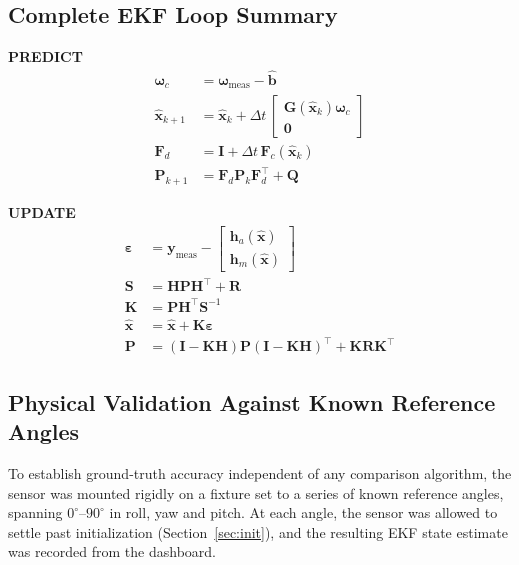 \documentclass[12pt,a4paper]{article}
\newcommand{\bx}{\bm{x}}
\newcommand{\bF}{\bm{F}}
\newcommand{\bG}{\bm{G}}
\newcommand{\bP}{\bm{P}}
\newcommand{\bQ}{\bm{Q}}
\newcommand{\bI}{\bm{I}}
\newcommand{\bomega}{\bm{\omega}}
\begin{document}
{%
\subsection{Complete EKF Loop Summary}
\label{sec:loop}

\textbf{PREDICT}
\begin{align*}
  \bomega_c         &= \bomega_{\text{meas}} - \hat{\bm{b}} \\
  \hat{\bx}_{k+1}   &= \hat{\bx}_k + \Delta t\,
                        \begin{bmatrix}\bG(\hat{\bx}_k)\bomega_c \\ \bm{0}\end{bmatrix} \\
  \bF_d             &= \bI + \Delta t\,\bF_c(\hat{\bx}_k) \\
  \bP_{k+1}         &= \bF_d\bP_k\bF_d^{\top} + \bQ
\end{align*}

\textbf{UPDATE}
\begin{align*}
  \bm{\varepsilon}  &= \bm{y}_{\text{meas}} -
                        \begin{bmatrix}\bm{h}_a(\hat{\bx})\\\bm{h}_m(\hat{\bx})\end{bmatrix} \\
  \bm{S}            &= \bm{H}\bP\bm{H}^{\top} + \bm{R} \\
  \bm{K}            &= \bP\bm{H}^{\top}\bm{S}^{-1} \\
  \hat{\bx}         &= \hat{\bx} + \bm{K}\bm{\varepsilon} \\
  \bP               &= (\bI{-}\bm{K}\bm{H})\bP(\bI{-}\bm{K}\bm{H})^{\top}
                        + \bm{K}\bm{R}\bm{K}^{\top}
\end{align*}




\subsection{Physical Validation Against Known Reference Angles}
\label{sec:known-angle-validation}

To establish ground-truth accuracy independent of any comparison
algorithm, the sensor was mounted rigidly on a fixture set to a
series of known reference angles, spanning
$0^{\circ}$--$90^{\circ}$ in roll, yaw and pitch. %
At each angle, the sensor was allowed to settle past
initialization (Section~\ref{sec:init}), and the resulting EKF
state estimate was recorded from the dashboard.

}
\end{document}
